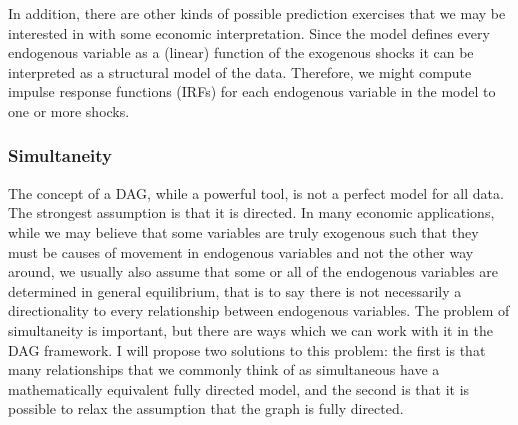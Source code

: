 \documentclass{article}
\begin{document}
In addition, there are other kinds of possible prediction exercises that we may be interested in with some economic interpretation. Since the model defines every endogenous variable as a (linear) function of the exogenous shocks it can be interpreted as a structural model of the data. Therefore, we might compute impulse response functions (IRFs) for each endogenous variable in the model to one or more shocks.

\subsubsection{Simultaneity} \label{simultaneity}

The concept of a DAG, while a powerful tool, is not a perfect model for all data. The strongest assumption is that it is directed. In many economic applications, while we may believe that some variables are truly exogenous such that they must be causes of movement in endogenous variables and not the other way around, we usually also assume that some or all of the endogenous variables are determined in general equilibrium, that is to say there is not necessarily a directionality to every relationship between endogenous variables. The problem of simultaneity is important, but there are ways which we can work with it in the DAG framework. I will propose two solutions to this problem: the first is that many relationships that we commonly think of as simultaneous have a mathematically equivalent fully directed model, and the second is that it is possible to relax the assumption that the graph is fully directed.
\end{document}
